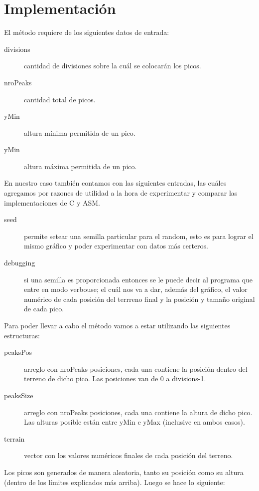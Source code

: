 \section{Implementación}
El método requiere de los siguientes datos de entrada:
\begin{description}
\item[divisions] cantidad de divisiones sobre la cuál se colocarán los picos.
\item[nroPeaks] cantidad total de picos.
\item[yMin] altura mínima permitida de un pico.
\item[yMin] altura máxima permitida de un pico.
\end{description}
\smallskip

En nuestro caso también contamos con las siguientes entradas, las cuáles agregamos por razones de utilidad a la hora de experimentar y comparar las implementaciones de C y ASM.
\begin{description}
\item[seed] permite setear una semilla particular para el random, esto es para lograr el mismo gráfico y poder experimentar con datos más certeros.
\item[debugging] si una semilla es proporcionada entonces se le puede decir al programa que entre en modo verbouse; el cuál nos va a dar, además del gráfico, el valor numérico de cada posición del terrreno final y la posición y tamaño original de cada pico.
\end{description}
\smallskip

Para poder llevar a cabo el método vamos a estar utilizando las siguientes estructuras:
\begin{description}
\item[peaksPos] arreglo con nroPeaks posiciones, cada una contiene la posición dentro del terreno de dicho pico. Las posiciones van de 0 a divisions-1.
\item[peaksSize] arreglo con nroPeaks posiciones, cada una contiene la altura de dicho pico. Las alturas posible están entre yMin e yMax (inclusive en ambos casos).
\item[terrain] vector con los valores numéricos finales de cada posición del terreno.
\end{description}
\smallskip

Los picos son generados de manera aleatoria, tanto su posición como su altura (dentro de los límites explicados más arriba). Luego se hace lo siguiente:

